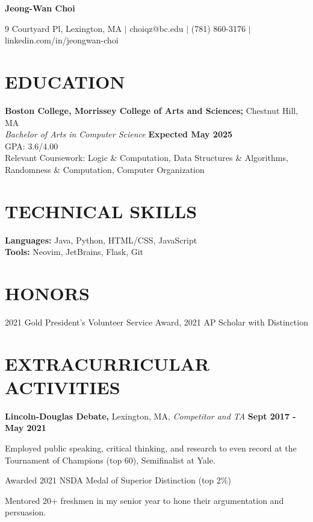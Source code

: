 \documentclass[11pt]{article}
\begin{document}
\begin{center}
\textbf{\LARGE Jeong-Wan Choi}
\end{center}

\begin{center}
9 Courtyard Pl, Lexington, MA $|$ choiqz@bc.edu $|$ (781) 860-3176 $|$ linkedin.com/in/jeongwan-choi 
\end{center}

\section*{EDUCATION}
\textbf{Boston College, Morrissey College of Arts and Sciences;} Chestnut Hill, MA \\
\textit{Bachelor of Arts in Computer Science} \hfill \textbf{Expected May 2025} \\
GPA: 3.6/4.00 \\
Relevant Coursework: Logic \& Computation, Data Structures \& Algorithms, Randomness \& Computation, Computer Organization

\section*{TECHNICAL SKILLS}
\textbf{Languages:} Java, Python, HTML/CSS, JavaScript \\
\textbf{Tools:} Neovim, JetBrains, Flask, Git 

\section*{HONORS}
2021 Gold President’s Volunteer Service Award, 2021 AP Scholar with Distinction

\section*{EXTRACURRICULAR ACTIVITIES}
\textbf{Lincoln-Douglas Debate,} Lexington, MA, \textit{Competitor and TA} \hfill \textbf{Sept 2017 - May 2021}
\begin{sublist}
  \item Employed public speaking, critical thinking, and research to even record at the Tournament of Champions (top 60), Semifinalist at Yale.
  \item Awarded 2021 NSDA Medal of Superior Distinction (top 2\%)
  \item Mentored 20+ freshmen in my senior year to hone their argumentation and persuasion.
\end{sublist}
\end{document}

